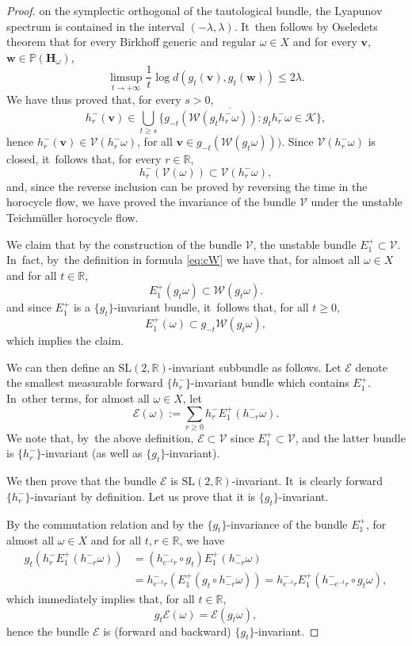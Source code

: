 \documentclass[10pt]{amsart}
\let\sep:
\theoremstyle{plain}
\theoremstyle{definition}
\numberwithin{equation}{subsection}
\newcommand\bP{\mathbb{P}}
\newcommand\bR{\mathbb{R}}\let\R\bR
\newcommand\cE{\mathcal{E}}
\newcommand\cK{\mathcal{K}}
\newcommand\cV{\mathcal{V}}
\newcommand\cW{\mathcal{W}}
\newcommand{\SL}{\mathrm{SL}}
\newcommand{\bfH}{\boldsymbol{H}}
\newcommand{\bfv}{\boldsymbol{v}}
\newcommand{\bfw}{\boldsymbol{w}}
\begin{document}
\begin{proof}
on the symplectic orthogonal of the tautological bundle, the Lyapunov spectrum is contained in the interval $(-\lambda, \lambda)$. It~then follows by Oseledets theorem that for every Birkhoff generic and regular $\omega\in X$ and for every ${\bfv}$, ${\bfw} \in \bP(\bfH_\omega)$,\vspace*{-3pt}
\[
\limsup_{t\to +\infty} \frac{1}{t} \log d(g_t({\bfv}), g_t({\bfw})) \leq 2 \lambda.
\]
We have thus proved that, for every $s>0$,
\[
h^-_r ({\bfv}) \in \overline{\bigcup_{t\geq s} \{ g_{-t} \left(\cW (g_{t}h^-_r\omega)\right) \sep g_{t}h^-_r\omega \in \cK\} },
\]
hence $h^-_r ({\bfv}) \in \cV (h^-_r\omega)$, for all ${\bfv} \in g_{-t} (\cW(g_{t} \omega)))$. Since $\cV (h^-_r\omega)$ is closed, it~follows that, for every $r\in \R$,\vspace*{-3pt}
\[
h^-_r \left(\cV (\omega) \right)
\subset \cV (h^-_r\omega),
\]
and, since the reverse inclusion can be proved by reversing the time in the horocycle flow, we have proved the invariance of the bundle $\cV$
under the unstable Teichmüller horocycle flow.

We claim that by the construction of the bundle $\cV$, the unstable bundle $E^+_1 \subset \cV$. In~fact, by~the definition in formula \eqref{eq:cW} we have that, for almost all $\omega \in X$ and for all $t\in \R$,\vspace*{-3pt}
\[
E^+_1 (g_{t} \omega) \subset \cW(g_{t}\omega).
\]
and since $E^+_1$ is a $\{g_t\}$-invariant bundle, it~follows that, for all $t\geq 0$,
\[
E^+_1 (\omega) \subset g_{-t} \cW(g_{t}\omega),
\]
which implies the claim.

We can then define an $\SL(2, \R)$-invariant subbundle as follows. Let $\cE$ denote the smallest measurable forward $\{h^-_r\}$-invariant bundle which contains $E^+_1$. In~other terms, for almost
all $\omega \in X$, let
\[
\cE(\omega) := \sum_{r\geq 0}
h^-_r E^+_1 (h^-_{-r} \omega).
\]
We note that, by~the above definition, $\cE \subset \cV$ since $E^+_1 \subset \cV$, and the latter bundle is $\{h^-_r\}$-invariant (as well as $\{g_t\}$-invariant).

We then prove that the bundle $\cE$
is $\SL(2,\bR)$-invariant. It~is clearly forward $\{h^-_r\}$-invariant by definition. Let us
prove that it is $\{g_t\}$-invariant.

By the commutation relation and by the $\{g_t\}$-invariance of the bundle $E^+_1$,
for almost all $\omega \in X$ and for all $t, r\in \R$, we have
\[
\begin{aligned}
g_t \left(h^-_r E^+_1 (h^-_{-r} \omega)\right) &=
(h^-_{e^{-t} r}\circ g_t) E^+_1 (h^-_{-r} \omega) \\ &= h^-_{e^{-t} r} \left(E^+_1 (g_t\circ h^-_{-r} \omega) \right) =
h^-_{e^{-t} r} E^+_1 (h^-_{-e^{-t}r} \circ g_t\omega),
\end{aligned}
\]
which immediately implies that, for all $t\in \R$,
\[
g_t \cE(\omega) = \cE (g_t\omega),
\]
hence the bundle $\cE$ is (forward and backward) $\{g_t\}$-invariant.


\end{proof}
\end{document}
